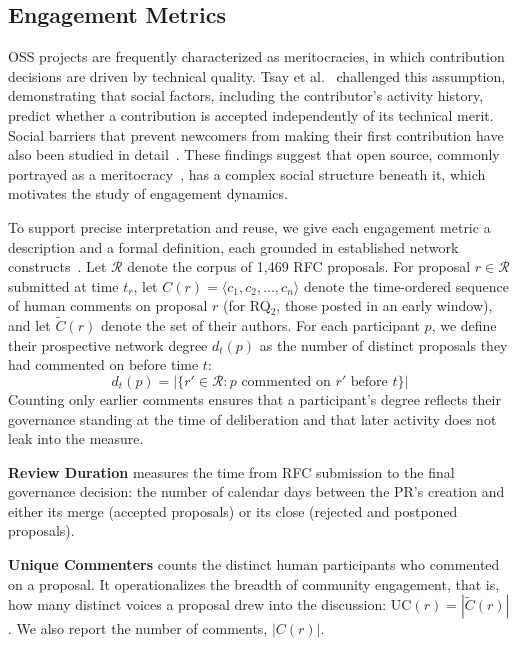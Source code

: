 \documentclass[conference]{IEEEtran}
\begin{document}
\subsection{Engagement Metrics}
OSS projects are frequently characterized as meritocracies, in which contribution decisions are driven by technical quality. Tsay et al.~\cite{tsay2014influence} challenged this assumption, demonstrating that social factors, including the contributor's activity history, predict whether a contribution is accepted independently of its technical merit. Social barriers that prevent newcomers from making their first contribution have also been studied in detail~\cite{steinmacher2015social}. These findings suggest that open source, commonly portrayed as a meritocracy~\cite{kondo2025empirical}, has a complex social structure beneath it, which motivates the study of engagement dynamics.

To support precise interpretation and reuse, we give each engagement metric a description and a formal definition, each grounded in established network constructs~\cite{freeman1978centrality, crowston2006hierarchy}. Let $\mathcal{R}$ denote the corpus of 1,469 RFC proposals. For proposal $r \in \mathcal{R}$ submitted at time $t_r$, let $C(r) = \langle c_1, c_2, \ldots, c_n \rangle$ denote the time-ordered sequence of human comments on proposal $r$ (for RQ$_2$, those posted in an early window), and let $\tilde{C}(r)$ denote the set of their authors. For each participant $p$, we define their prospective network degree $d_t(p)$ as the number of distinct proposals they had commented on before time $t$:
\begin{equation}
  d_t(p) = \left|\{r' \in \mathcal{R} : p \text{ commented on } r' \text{ before } t\}\right|
  \label{eq:degree}
\end{equation}
Counting only earlier comments ensures that a participant's degree reflects their governance standing at the time of deliberation and that later activity does not leak into the measure.

\textbf{Review Duration} measures the time from RFC submission to the final governance decision: the number of calendar days between the PR's creation and either its merge (accepted proposals) or its close (rejected and postponed proposals).

\textbf{Unique Commenters} counts the distinct human participants who commented on a proposal. It operationalizes the breadth of community engagement, that is, how many distinct voices a proposal drew into the discussion: $\text{UC}(r) = |\tilde{C}(r)|$. We also report the number of comments, $|C(r)|$.
\end{document}
